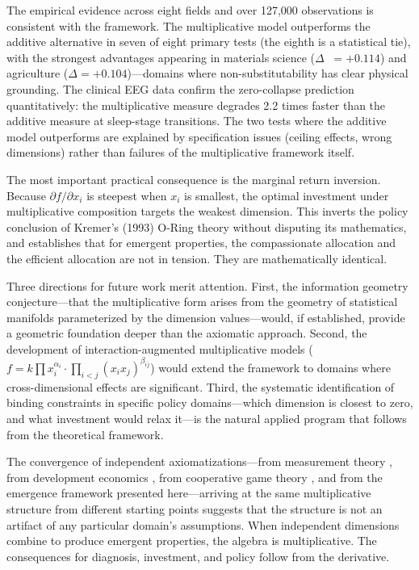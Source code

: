 \documentclass[12pt, a4paper]{article}
\theoremstyle{definition}
\theoremstyle{remark}
\DeclareMathOperator{\Spearman}{\rho_s}
\begin{document}
The empirical evidence across eight fields and over 127,000 observations is consistent with the framework. The multiplicative model outperforms the additive alternative in seven of eight primary tests (the eighth is a statistical tie), with the strongest advantages appearing in materials science ($\Delta\Spearman = +0.114$) and agriculture ($\Delta = +0.104$)---domains where non-substitutability has clear physical grounding. The clinical EEG data confirm the zero-collapse prediction quantitatively: the multiplicative measure degrades 2.2 times faster than the additive measure at sleep-stage transitions. The two tests where the additive model outperforms are explained by specification issues (ceiling effects, wrong dimensions) rather than failures of the multiplicative framework itself.

The most important practical consequence is the marginal return inversion. Because $\partial f / \partial x_i$ is steepest when $x_i$ is smallest, the optimal investment under multiplicative composition targets the weakest dimension. This inverts the policy conclusion of Kremer's (1993) O-Ring theory without disputing its mathematics, and establishes that for emergent properties, the compassionate allocation and the efficient allocation are not in tension. They are mathematically identical.

Three directions for future work merit attention. First, the information geometry conjecture---that the multiplicative form arises from the geometry of statistical manifolds parameterized by the dimension values---would, if established, provide a geometric foundation deeper than the axiomatic approach. Second, the development of interaction-augmented multiplicative models ($f = k \prod x_i^{\alpha_i} \cdot \prod_{i<j} (x_i x_j)^{\beta_{ij}}$) would extend the framework to domains where cross-dimensional effects are significant. Third, the systematic identification of binding constraints in specific policy domains---which dimension is closest to zero, and what investment would relax it---is the natural applied program that follows from the theoretical framework.

The convergence of independent axiomatizations---from measurement theory \cite{luce1965}, from development economics \cite{jones2011, kremer1993}, from cooperative game theory \cite{pitz2026}, and from the emergence framework presented here---arriving at the same multiplicative structure from different starting points suggests that the structure is not an artifact of any particular domain's assumptions. When independent dimensions combine to produce emergent properties, the algebra is multiplicative. The consequences for diagnosis, investment, and policy follow from the derivative.
\end{document}
